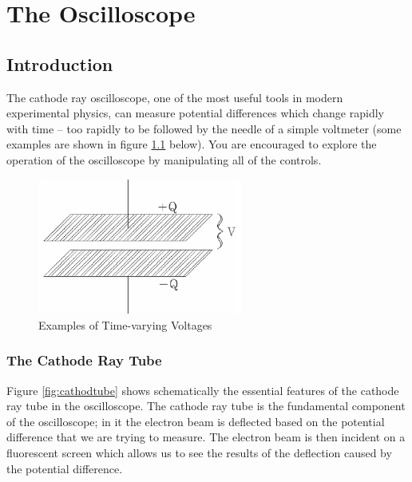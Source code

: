 \chapter{The Oscilloscope}

\section{Introduction}

The cathode ray oscilloscope, one of the most useful tools in modern experimental physics, can measure potential differences which change rapidly with time -- too rapidly to be followed by the needle of a simple voltmeter (some examples are shown in figure \ref{fig:voltagesample} below). You are encouraged to explore the operation of the oscilloscope by manipulating all of the controls.

\begin{figure}[h]
    \begin{center}
        \includegraphics[width=0.6\textwidth]{./Exp3/pic/image1.png}
    \end{center}
    \caption{Examples of Time-varying Voltages}
    \label{fig:voltagesample}
\end{figure}

\subsection{The Cathode Ray Tube}

Figure \ref{fig:cathodtube} shows schematically the essential features of the cathode ray tube in the oscilloscope. The cathode ray tube is the fundamental component of the oscilloscope; in it the electron beam is deflected based on the potential difference that we are trying to measure. The electron beam is then incident on a fluorescent screen which allows us to see the results of the deflection caused by the potential difference. \myskip

